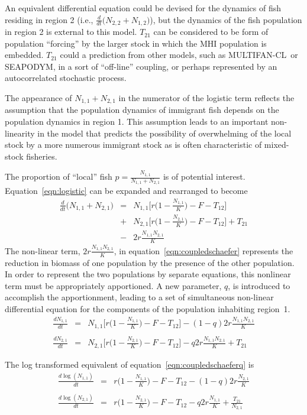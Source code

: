 \documentclass[12pt,letterpaper]{article}
\newcommand\SD{SEAPODYM}
\newcommand\MFCL{MULTIFAN-CL}
\newcommand\None{{N_{1,1}}}
\newcommand\Ntwo{{N_{2,1}}}
\newcommand\Nsum{{N_{1,1}+N_{2,1}}}
\begin{document}
An equivalent differential equation could be devised for the dynamics of
fish residing in region 2 
(i.e., $\frac{d}{dt}\big(N_{2,2}+N_{1,2}\big)$), but 
the dynamics of the fish population in region 2 is external to this
model. $T_{21}$ can be considered to be form of population ``forcing''
by the larger stock in which the MHI population is embedded. $T_{21}$
could a prediction from other models, such as \MFCL\ or \SD, in a sort of
``off-line'' coupling, or perhaps represented by an
autocorrelated stochastic process. 

The appearance of
$\Nsum$ in the numerator of the logistic term reflects the assumption
that the population dynamics of immigrant fish depends on
the population dynamics in region 1. This assumption leads to an
important non-linearity in the model that predicts the possibility of
overwhelming of the
local stock by a more numerous immigrant stock as is often characteristic of
mixed-stock fisheries.

The proportion of ``local'' fish $p = \frac{\None}{\Nsum}$ is of potential interest.
Equation~\ref{eqn:logistic} can be expanded and rearranged to become
\begin{eqnarray}
\label{eqn:coupledschaefer}
\frac{d}{dt}\big(\Nsum\big) &=&\None\Big[r\Big(1-\frac{\None}{K}\Big)
-F - T_{12}\Big] \nonumber\\
&+&\Ntwo\Big[r\Big(1-\frac{\Ntwo}{K}\Big)
-F - T_{12}\Big]  + T_{21}\\
&-& 2r\frac{\None\Ntwo}{K}\nonumber
\end{eqnarray}
The non-linear term, $2r\frac{\None\Ntwo}{K}$, in
equation~\ref{eqn:coupledschaefer} represents the reduction in biomass
of one population by the presence of the other population.
In order to represent
the two populations by separate equations, this
nonlinear term must be appropriately apportioned.
A new parameter, $q$, is introduced to accomplish the apportionment,
leading to a set of simultaneous non-linear differential equation for the
components of the population inhabiting region~1.
\begin{eqnarray}
\label{eqn:coupledschaeferq}
\frac{d\None}{dt}&=&\None\Big[r\Big(1-\frac{\None}{K}\Big)
-F - T_{12}\Big] - (1-q)2r\frac{\None\Ntwo}{K}\nonumber\\
\\
\frac{d\Ntwo}{dt}&=&\Ntwo\Big[r\Big(1-\frac{\Ntwo}{K}\Big)
-F - T_{12}\Big] - q2r\frac{\None\Ntwo}{K} + T_{21}\nonumber
\end{eqnarray}

The log transformed equivalent of equation~\ref{eqn:coupledschaeferq}
is
\begin{eqnarray}
\label{eqn:coupledlogschaefer}
\frac{d\log(\None)}{dt}&=&r\Big(1-\frac{\None}{K}\Big) -F - T_{12} -
(1-q)2r\frac{\Ntwo}{K}\nonumber\\
\\
\frac{d\log(\Ntwo)}{dt}&=&r\Big(1-\frac{\Ntwo}{K}\Big) -F - T_{12} -
q2r\frac{\None}{K} + \frac{T_{21}}{\Ntwo}\nonumber
\end{eqnarray}
\end{document}
